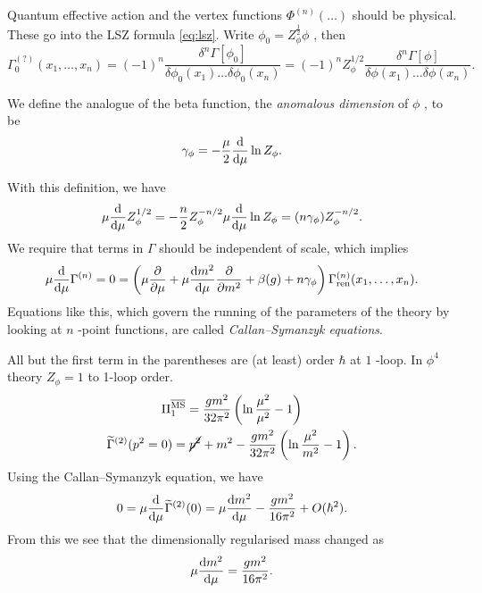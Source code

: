 Quantum effective action and the vertex functions $\Phi^{(n)}( \dots)$ should be physical.
These go into the LSZ formula \eqref{eq:lsz}.
Write $\phi_0 = Z_\phi^{\frac{1}{2}} \phi$ , then
\begin{equation}
  \Gamma^{(?)}_{0} (x_1, \dots, x_n) = (-1)^n \frac{\delta^{n} \Gamma[\phi_0]}{\delta \phi_0 (x_1) \dots \delta\phi_0(x_n)} = (-1)^n Z_{\phi}^{1/ 2} \frac{\delta^n \Gamma[\phi]}{\delta \phi(x_1) \dots \delta \phi(x_n)}.
\end{equation}
\begin{definition}
  We define the analogue of the beta function, the \emph{anomalous dimension} of $\phi$ , to be
  \begin{equation}
    \gamma_\phi = -\frac{\mu}{2} \dv{\mu} \ln Z_\phi.
  \end{equation}
\end{definition}
With this definition, we have
\begin{equation}
  \mu \dv{\mu} Z_\phi^{1 / 2} = -\frac{n}{2} Z_\phi^{-n / 2} \mu \dv{\mu} \ln Z_\phi = (n \gamma_\phi) Z_\phi^{-n / 2}.
\end{equation}
We require that terms in $\Gamma$ should be independent of scale, which implies
\begin{equation}
  \mu \dv{\mu} \Gamma^{(n)} = 0 = \left( \mu \pdv{\mu} + \mu \dv{m^2}{\mu} \frac{\partial }{\partial m^2} + \beta(g) + n \gamma_\phi \right) \Gamma^{(n)}_{\text{ren}} (x_1, \dots, x_n).
\end{equation}
Equations like this, which govern the running of the parameters of the theory by looking at $n$ -point functions, are called \emph{Callan--Symanzyk equations}.

All but the first term in the parentheses are (at least) order $\hbar$  at $1$ -loop.
In $\phi^4$  theory $Z_\phi = 1$ to 1-loop order. 
\begin{gather}
  \Pi_1^{\overline{\text{MS}}{}} = \frac{g m^2}{32 \pi^2} \left( \ln \frac{\mu^2}{\mu^2} - 1 \right) \\
  \widetilde{\Gamma}^{(2)} (p^2 = 0) = \cancel{p^2} + m^2 - \frac{g m^2}{32 \pi^2} \left( \ln \frac{\mu^2}{m^2} - 1 \right).
\end{gather}
Using the Callan--Symanzyk equation, we have
\begin{equation}
  0 = \mu \dv{\mu} \widetilde{\Gamma}^{(2)}(0) = \mu \dv{m^2}{\mu} - \frac{g m^2}{16 \pi^2} + O(\hbar^2).
\end{equation}
From this we see that the dimensionally regularised mass changed as 
\begin{equation}
  \mu \dv{m^2}{\mu} = \frac{g m^2}{16 \pi^2}.
\end{equation}

